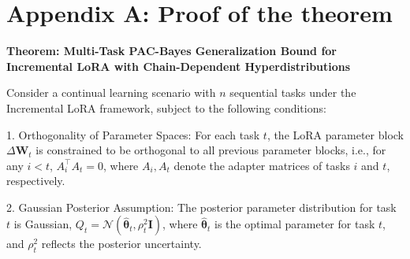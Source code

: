 \documentclass[letterpaper]{article} %
\begin{document}









\appendix

\section{Appendix A: Proof of the theorem}

\textbf{Theorem: Multi-Task PAC-Bayes Generalization Bound for Incremental LoRA with Chain-Dependent Hyperdistributions}


Consider a continual learning scenario with $n$ sequential tasks under the Incremental LoRA framework, subject to the following conditions:

1. Orthogonality of Parameter Spaces: For each task $t$, the LoRA parameter block $\Delta\mathbf{W}_t$ is constrained to be orthogonal to all previous parameter blocks, i.e., for any $i < t$, $A_i^\top A_t = 0$, where $A_i, A_t$ denote the adapter matrices of tasks $i$ and $t$, respectively.

2. Gaussian Posterior Assumption: The posterior parameter distribution for task $t$ is Gaussian, $Q_t = \mathcal{N}(\hat{\boldsymbol{\theta}}_t, \rho_t^2 \mathbf{I})$, where $\hat{\boldsymbol{\theta}}_t$ is the optimal parameter for task $t$, and $\rho_t^2$ reflects the posterior uncertainty.
\end{document}
